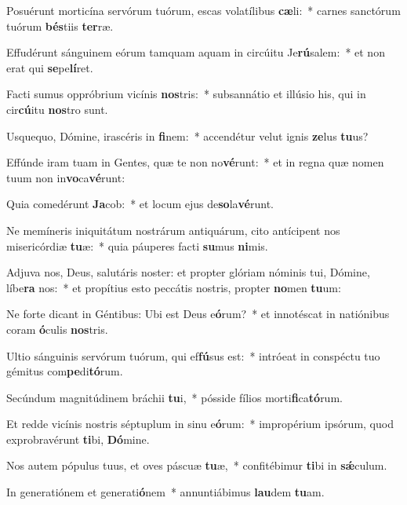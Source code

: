 \item Posuérunt morticína servórum tuórum, escas volatílibus \textbf{cæ}li:~* carnes sanctórum tuórum \textbf{bés}tiis \textbf{ter}ræ.
\item Effudérunt sánguinem eórum tamquam aquam in circúitu Je\textbf{rú}salem:~* et non erat qui \textbf{se}pe\textbf{lí}ret.
\item Facti sumus oppróbrium vicínis \textbf{nos}tris:~* subsannátio et illúsio his, qui in cir\textbf{cú}itu \textbf{nos}tro sunt.
\item Usquequo, Dómine, irascéris in \textbf{fi}nem:~* accendétur velut ignis \textbf{ze}lus \textbf{tu}us?
\item Effúnde iram tuam in Gentes, quæ te non no\textbf{vé}runt:~* et in regna quæ nomen tuum non in\textbf{vo}ca\textbf{vé}runt:
\item Quia comedérunt \textbf{Ja}cob:~* et locum ejus de\textbf{so}la\textbf{vé}runt.
\item Ne memíneris iniquitátum nostrárum antiquárum, cito antícipent nos misericórdiæ \textbf{tu}æ:~* quia páuperes facti \textbf{su}mus \textbf{ni}mis.
\item Adjuva nos, Deus, salutáris noster: et propter glóriam nóminis tui, Dómine, líbe\textbf{ra} nos:~* et propítius esto peccátis nostris, propter \textbf{no}men \textbf{tu}um:
\item Ne forte dicant in Géntibus: Ubi est Deus e\textbf{ó}rum?~* et innotéscat in natiónibus coram \textbf{ó}culis \textbf{nos}tris.
\item Ultio sánguinis servórum tuórum, qui ef\textbf{fú}sus est:~* intróeat in conspéctu tuo gémitus com\textbf{pe}di\textbf{tó}rum.
\item Secúndum magnitúdinem bráchii \textbf{tu}i,~* pósside fílios morti\textbf{fi}ca\textbf{tó}rum.
\item Et redde vicínis nostris séptuplum in sinu e\textbf{ó}rum:~* impropérium ipsórum, quod exprobravérunt \textbf{ti}bi, \textbf{Dó}mine.
\item Nos autem pópulus tuus, et oves páscuæ \textbf{tu}æ,~* confitébimur \textbf{ti}bi in \textbf{sǽ}culum.
\item In generatiónem et generati\textbf{ó}nem~* annuntiábimus \textbf{lau}dem \textbf{tu}am.
